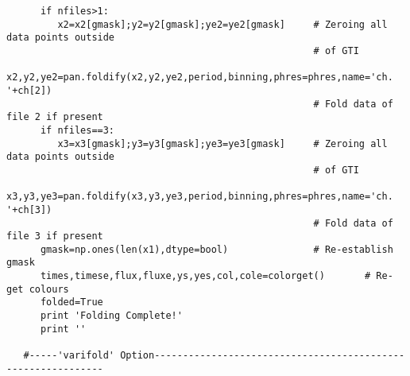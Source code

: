 \begin{verbatim}
      if nfiles>1:
         x2=x2[gmask];y2=y2[gmask];ye2=ye2[gmask]     # Zeroing all data points outside
                                                      # of GTI
         x2,y2,ye2=pan.foldify(x2,y2,ye2,period,binning,phres=phres,name='ch. '+ch[2])
                                                      # Fold data of file 2 if present
      if nfiles==3:
         x3=x3[gmask];y3=y3[gmask];ye3=ye3[gmask]     # Zeroing all data points outside
                                                      # of GTI
         x3,y3,ye3=pan.foldify(x3,y3,ye3,period,binning,phres=phres,name='ch. '+ch[3])
                                                      # Fold data of file 3 if present
      gmask=np.ones(len(x1),dtype=bool)               # Re-establish gmask
      times,timese,flux,fluxe,ys,yes,col,cole=colorget()       # Re-get colours
      folded=True
      print 'Folding Complete!'
      print ''

   #-----'varifold' Option-------------------------------------------------------------


\end{verbatim}
